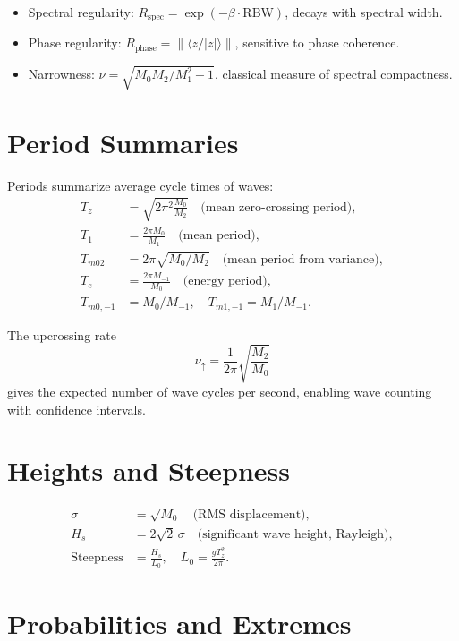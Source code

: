 \documentclass[11pt]{article}
\begin{document}
\begin{itemize}
  \item Spectral regularity: $R_{\text{spec}} = \exp(-\beta\cdot \text{RBW})$, decays with spectral width.
  \item Phase regularity: $R_{\text{phase}} = \|\langle z/|z|\rangle\|$, sensitive to phase coherence.
  \item Narrowness: $\nu = \sqrt{M_0 M_2/M_1^2 - 1}$, classical measure of spectral compactness.
\end{itemize}

\section{Period Summaries}

Periods summarize average cycle times of waves:
\begin{align}
T_z &= \sqrt{2\pi^2 \tfrac{M_0}{M_2}} \quad \text{(mean zero-crossing period)}, \\
T_1 &= \tfrac{2\pi M_0}{M_1} \quad \text{(mean period)}, \\
T_{m02} &= 2\pi\sqrt{M_0/M_2} \quad \text{(mean period from variance)}, \\
T_e &= \tfrac{2\pi M_{-1}}{M_0} \quad \text{(energy period)}, \\
T_{m0,-1} &= M_0/M_{-1}, \quad
T_{m1,-1} = M_1/M_{-1}.
\end{align}

The upcrossing rate
\[
\nu_{\uparrow} = \frac{1}{2\pi}\sqrt{\frac{M_2}{M_0}}
\]
gives the expected number of wave cycles per second, enabling wave counting with confidence intervals.

\section{Heights and Steepness}

\begin{align}
\sigma &= \sqrt{M_0} \quad \text{(RMS displacement)}, \\
H_s &= 2\sqrt{2}\,\sigma \quad \text{(significant wave height, Rayleigh)}, \\
\text{Steepness} &= \frac{H_s}{L_0}, \quad L_0 = \frac{g T_z^2}{2\pi}.
\end{align}

\section{Probabilities and Extremes}
\end{document}
